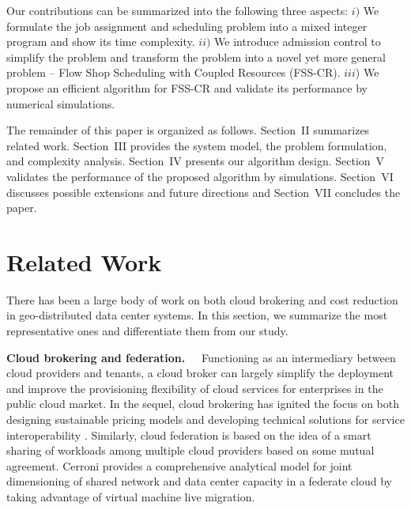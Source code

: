 \documentclass{article}
\newcommand{\bpara}[2]{\noindent\textbf{#1~~}{#2}}
\begin{document}
Our contributions can be summarized into the following three aspects: $i)$ We formulate the job assignment and scheduling problem into a mixed integer program and show its time complexity. $ii)$ We introduce admission control to simplify the problem and transform the problem into a novel yet more general problem -- Flow Shop Scheduling with Coupled Resources (FSS-CR). $iii$) We propose an efficient algorithm for FSS-CR and validate its performance by numerical simulations.

The remainder of this paper is organized as follows. Section~II summarizes related work. Section~III provides the system model, the problem formulation, and complexity analysis. Section~IV presents our algorithm design. Section~V validates the performance of the proposed algorithm by simulations. Section~VI discusses possible extensions and future directions and Section~VII concludes the paper.

    
\section{Related Work}
\label{sec:related}

There has been a large body of work on both cloud brokering and cost reduction in geo-distributed data center systems. In this section, we summarize the most representative ones and differentiate them from our study.

\bpara{Cloud brokering and federation.}{
Functioning as an intermediary between cloud providers and tenants, a cloud broker can largely simplify the deployment and improve the provisioning flexibility of cloud services for enterprises in the public cloud market. In the sequel, cloud brokering has ignited the focus on both designing sustainable pricing models and developing technical solutions for service interoperability \cite{Guzek-CSB-2015}. Similarly, cloud federation is based on the idea of a smart sharing of workloads among multiple cloud providers based on some mutual agreement. Cerroni \cite{Cerroni-DCC-2014} provides a comprehensive analytical model for joint dimensioning of shared network and data center capacity in a federate cloud by taking advantage of virtual machine live migration. }
\end{document}
